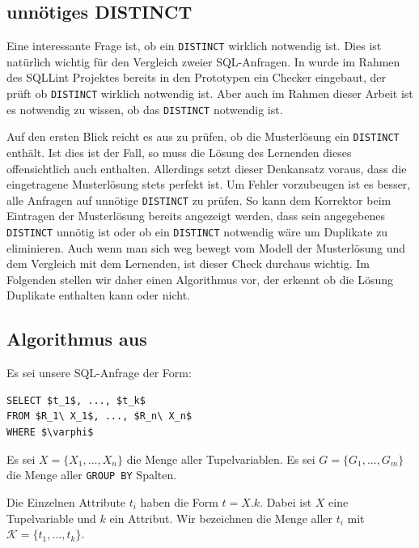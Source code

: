 \subsection{unnötiges DISTINCT}

Eine interessante Frage ist, ob ein \verb|DISTINCT| wirklich notwendig ist. Dies ist natürlich wichtig für den Vergleich zweier SQL-Anfragen. In \cite{brass2} wurde im Rahmen des SQLLint Projektes bereits in den Prototypen ein Checker eingebaut, der prüft ob \verb|DISTINCT| wirklich notwendig ist. Aber auch im Rahmen dieser Arbeit ist es notwendig zu wissen, ob das \verb|DISTINCT| notwendig ist. 

Auf den ersten Blick reicht es aus zu prüfen, ob die Musterlösung ein \verb|DISTINCT| enthält. Ist dies ist der Fall, so muss die Lösung des Lernenden dieses offensichtlich auch enthalten. Allerdings setzt dieser Denkansatz voraus, dass die eingetragene Musterlösung stets perfekt ist. Um Fehler vorzubeugen ist es besser, alle Anfragen auf unnötige \verb|DISTINCT| zu prüfen. So kann dem Korrektor beim Eintragen der Musterlösung bereits angezeigt werden, dass sein angegebenes \verb|DISTINCT| unnötig ist oder ob ein \verb|DISTINCT| notwendig wäre um Duplikate zu eliminieren. Auch wenn man sich weg bewegt vom Modell der Musterlösung und dem Vergleich mit dem Lernenden, ist dieser Check durchaus wichtig. Im Folgenden stellen wir daher einen Algorithmus vor, der erkennt ob die Lösung Duplikate enthalten kann oder nicht.

\subsection{Algorithmus aus \cite{sql1folien}}

Es sei unsere SQL-Anfrage der Form:

\begin{lstlisting}[mathescape]
SELECT $t_1$, ..., $t_k$
FROM $R_1\ X_1$, ..., $R_n\ X_n$
WHERE $\varphi$
\end{lstlisting}

Es sei $X=\{X_1, ..., X_n\}$ die Menge aller Tupelvariablen. Es sei $G=\{G_1, ..., G_m\}$ die Menge aller \verb|GROUP BY| Spalten.

Die Einzelnen Attribute $t_i$ haben die Form $t = X.k$. Dabei ist $X$ eine Tupelvariable und $k$ ein Attribut. Wir bezeichnen die Menge aller $t_i$ mit $\mathcal{K}=\{t_1,...,t_k\}$.

